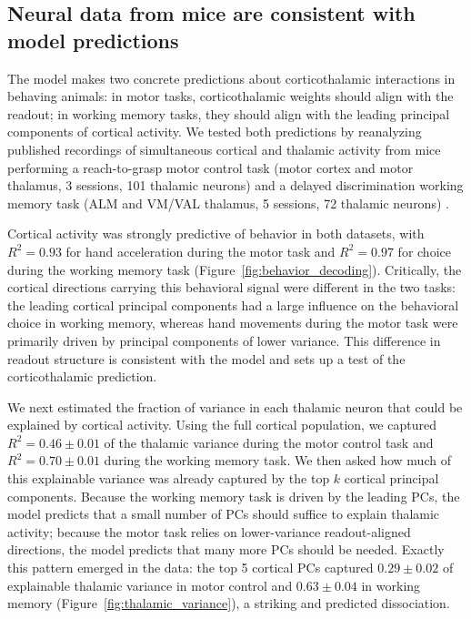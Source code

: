 \documentclass[11pt]{article}
\begin{document}
\subsection{Neural data from mice are consistent with model predictions}

The model makes two concrete predictions about corticothalamic
interactions in behaving animals: in motor tasks, corticothalamic
weights should align with the readout; in working memory tasks, they
should align with the leading principal components of cortical
activity. We tested both predictions by reanalyzing published
recordings of simultaneous cortical and thalamic activity from mice
performing a reach-to-grasp motor control task (motor cortex and motor
thalamus, 3 sessions, 101 thalamic neurons)
\cite{sauerbrei2020cortical} and a delayed discrimination working
memory task (ALM and VM/VAL thalamus, 5 sessions, 72 thalamic
neurons) \cite{guo2017maintenance}.

Cortical activity was strongly predictive of behavior in both
datasets, with $R^2 = 0.93$ for hand acceleration during the motor
task and $R^2 = 0.97$ for choice during the working memory task
(Figure~\ref{fig:behavior_decoding}). Critically, the cortical
directions carrying this behavioral signal were different in the two
tasks: the leading cortical principal components had a large influence
on the behavioral choice in working memory, whereas hand movements
during the motor task were primarily driven by principal components
of lower variance. This difference in readout structure is consistent
with the model and sets up a test of the corticothalamic prediction.

We next estimated the fraction of variance in each thalamic neuron
that could be explained by cortical activity. Using the full cortical
population, we captured $R^2 = 0.46 \pm 0.01$ of the thalamic variance
during the motor control task and $R^2 = 0.70 \pm 0.01$ during the
working memory task. We then asked how much of this explainable
variance was already captured by the top $k$ cortical principal
components. Because the working memory task is driven by the leading
PCs, the model predicts that a small number of PCs should suffice to
explain thalamic activity; because the motor task relies on
lower-variance readout-aligned directions, the model predicts that
many more PCs should be needed. Exactly this pattern emerged in the
data: the top 5 cortical PCs captured $0.29 \pm 0.02$ of explainable
thalamic variance in motor control and $0.63 \pm 0.04$ in working
memory (Figure~\ref{fig:thalamic_variance}), a striking and
predicted dissociation.
\end{document}
